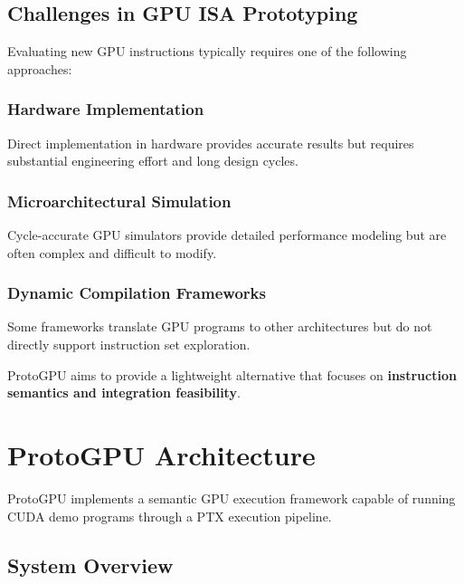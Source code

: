 \documentclass[11pt]{article}
\begin{document}
\hypertarget{challenges-in-gpu-isa-prototyping}{%
\subsection{Challenges in GPU ISA
Prototyping}\label{challenges-in-gpu-isa-prototyping}}

Evaluating new GPU instructions typically requires one of the following
approaches:

\hypertarget{hardware-implementation}{%
\subsubsection{Hardware Implementation}\label{hardware-implementation}}

Direct implementation in hardware provides accurate results but requires
substantial engineering effort and long design cycles.

\hypertarget{microarchitectural-simulation}{%
\subsubsection{Microarchitectural
Simulation}\label{microarchitectural-simulation}}

Cycle-accurate GPU simulators provide detailed performance modeling but
are often complex and difficult to modify.

\hypertarget{dynamic-compilation-frameworks}{%
\subsubsection{Dynamic Compilation
Frameworks}\label{dynamic-compilation-frameworks}}

Some frameworks translate GPU programs to other architectures but do not
directly support instruction set exploration.

ProtoGPU aims to provide a lightweight alternative that focuses on
\textbf{instruction semantics and integration feasibility}.


\hypertarget{protogpu-architecture}{%
\section{ProtoGPU Architecture}\label{protogpu-architecture}}

ProtoGPU implements a semantic GPU execution framework capable of
running CUDA demo programs through a PTX execution pipeline.

\hypertarget{system-overview}{%
\subsection{System Overview}\label{system-overview}}
\end{document}

